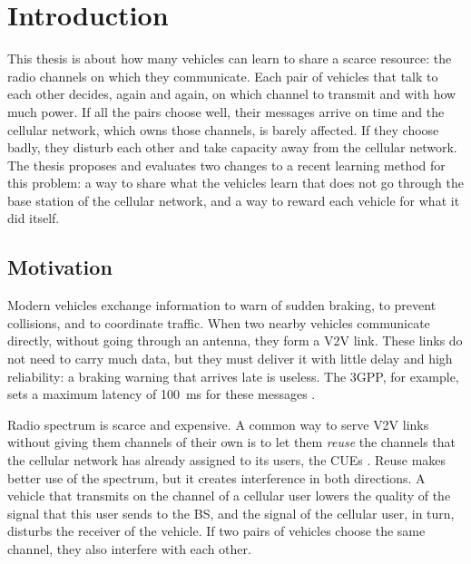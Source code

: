 \chapter{Introduction}
\label{chap:introduction}

This thesis is about how many vehicles can learn to share a scarce resource: the radio channels on which
they communicate. Each pair of vehicles that talk to each other decides, again and again, on which channel
to transmit and with how much power. If all the pairs choose well, their messages arrive on time and the
cellular network, which owns those channels, is barely affected. If they choose badly, they disturb each
other and take capacity away from the cellular network. The thesis proposes and evaluates two changes to a
recent learning method for this problem: a way to share what the vehicles learn that does not go through
the base station of the cellular network, and a way to reward each vehicle for what it did itself.

\section{Motivation}
\label{sec:intro-motivation}

Modern vehicles exchange information to warn of sudden braking, to prevent collisions, and to coordinate
traffic. When two nearby vehicles communicate directly, without going through an antenna, they form a
\ac{V2V} link. These links do not need to carry much data, but they must deliver it with little delay and
high reliability: a braking warning that arrives late is useless. The \ac{3GPP}, for example, sets a maximum
latency of \SI{100}{\milli\second} for these messages \cite{3gpp16v2x}.

Radio spectrum is scarce and expensive. A common way to serve \ac{V2V} links without giving them channels of
their own is to let them \emph{reuse} the channels that the cellular network has already assigned to its
users, the \acp{CUE} \cite{liang+19spectrum,li+22fedmarl}. Reuse makes better use of the spectrum, but it
creates interference in both directions. A vehicle that transmits on the channel of a cellular user lowers
the quality of the signal that this user sends to the \ac{BS}, and the signal of the cellular user, in turn,
disturbs the receiver of the vehicle. If two pairs of vehicles choose the same channel, they also interfere
with each other.

